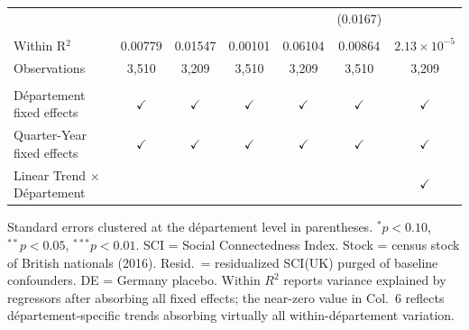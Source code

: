 \begin{table}[htbp]
\begin{tabular}{lcccccc}
                                             &               &                &               &                & (0.0167)      &   \\   
       \\
      Within R$^2$                           & 0.00779       & 0.01547        & 0.00101       & 0.06104        & 0.00864       & $2.13\times 10^{-5}$\\   
      Observations                           & 3,510         & 3,209          & 3,510         & 3,209          & 3,510         & 3,209\\  
       \\
      D\'epartement fixed effects            & $\checkmark$  & $\checkmark$   & $\checkmark$  & $\checkmark$   & $\checkmark$  & $\checkmark$\\   
      Quarter-Year fixed effects             & $\checkmark$  & $\checkmark$   & $\checkmark$  & $\checkmark$   & $\checkmark$  & $\checkmark$\\   
      Linear Trend $\times $ D\'epartement   &               &                &               &                &               & $\checkmark$\\   
      \bottomrule
   \end{tabular}
\par\vspace{0.3em}\noindent\footnotesize Standard errors clustered at the d\'epartement level in parentheses. $^{*}p<0.10$, $^{**}p<0.05$, $^{***}p<0.01$. SCI = Social Connectedness Index. Stock = census stock of British nationals (2016). Resid.\ = residualized SCI(UK) purged of baseline confounders. DE = Germany placebo. Within $R^2$ reports variance explained by regressors after absorbing all fixed effects; the near-zero value in Col.~6 reflects d\'epartement-specific trends absorbing virtually all within-d\'epartement variation.
\end{table}


